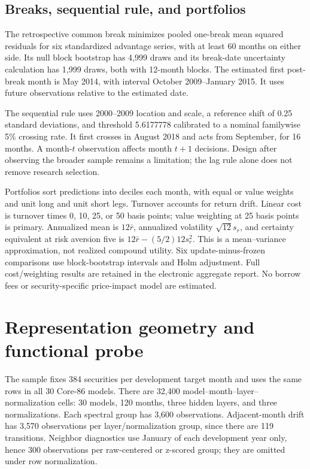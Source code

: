 \documentclass[11pt]{article}
\begin{document}


\subsection{Breaks, sequential rule, and portfolios}
The retrospective common break minimizes pooled one-break mean squared residuals for six standardized advantage series, with at least 60 months on either side. Its null block bootstrap has 4,999 draws and its break-date uncertainty calculation has 1,999 draws, both with 12-month blocks. The estimated first post-break month is May 2014, with interval October 2009--January 2015. It uses future observations relative to the estimated date.

The sequential rule uses 2000--2009 location and scale, a reference shift of 0.25 standard deviations, and threshold 5.6177778 calibrated to a nominal familywise 5\% crossing rate. It first crosses in August 2018 and acts from September, for 16 months. A month-$t$ observation affects month $t+1$ decisions. Design after observing the broader sample remains a limitation; the lag rule alone does not remove research selection.

Portfolios sort predictions into deciles each month, with equal or value weights and unit long and unit short legs. Turnover accounts for return drift. Linear cost is turnover times 0, 10, 25, or 50 basis points; value weighting at 25 basis points is primary. Annualized mean is $12\bar r$, annualized volatility $\sqrt{12}s_r$, and certainty equivalent at risk aversion five is $12\bar r-(5/2)12s_r^2$. This is a mean--variance approximation, not realized compound utility. Six update-minus-frozen comparisons use block-bootstrap intervals and Holm adjustment. Full cost/weighting results are retained in the electronic aggregate report. No borrow fees or security-specific price-impact model are estimated.



\section{Representation geometry and functional probe}
\setcounter{equation}{0}
The sample fixes 384 securities per development target month and uses the same rows in all 30 Core-86 models. There are 32,400 model--month--layer--normalization cells: 30 models, 120 months, three hidden layers, and three normalizations. Each spectral group has 3,600 observations. Adjacent-month drift has 3,570 observations per layer/normalization group, since there are 119 transitions. Neighbor diagnostics use January of each development year only, hence 300 observations per raw-centered or z-scored group; they are omitted under row normalization.
\end{document}

